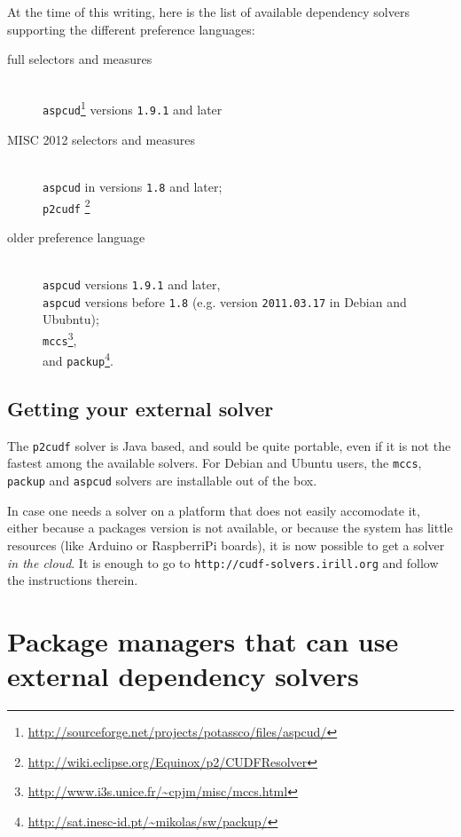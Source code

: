 \documentclass{article}
\begin{document}
At the time of this writing, here is the list of available dependency solvers supporting
the different preference languages:

\begin{description}
 \item[full selectors and measures] \mbox{}\\\texttt{aspcud}\footnote{\url{http://sourceforge.net/projects/potassco/files/aspcud/}} versions \texttt{1.9.1} and later
 \item[MISC 2012 selectors and measures]\mbox{}\\
      \texttt{aspcud} in versions \texttt{1.8} and later;\\
      \texttt{p2cudf} \footnote{\url{http://wiki.eclipse.org/Equinox/p2/CUDFResolver}}
 \item[older preference language]\mbox{}\\
      \texttt{aspcud} versions \texttt{1.9.1} and later,\\
      \texttt{aspcud} versions before \texttt{1.8} (e.g. version \texttt{2011.03.17} in Debian and Ububntu);\\
      \texttt{mccs}\footnote{\url{http://www.i3s.unice.fr/~cpjm/misc/mccs.html}},\\
      and \texttt{packup}\footnote{\url{http://sat.inesc-id.pt/~mikolas/sw/packup/}}.
\end{description}

\subsection{Getting your external solver}
The \texttt{p2cudf} solver is Java based, and sould be quite portable, even if it is not
the fastest among the available solvers.
For Debian and Ubuntu users, the \texttt{mccs}, \texttt{packup} and \texttt{aspcud} solvers
are installable out of the box.

In case one needs a solver on a platform that does not easily accomodate it, either
because a packages version is not available, or because the system has little resources
(like Arduino or RaspberriPi boards), it is now possible to get a solver \emph{in the cloud}.
It is enough to go to \texttt{http://cudf-solvers.irill.org} and follow the instructions therein.

\section{Package managers that can use external dependency solvers}
\end{document}
